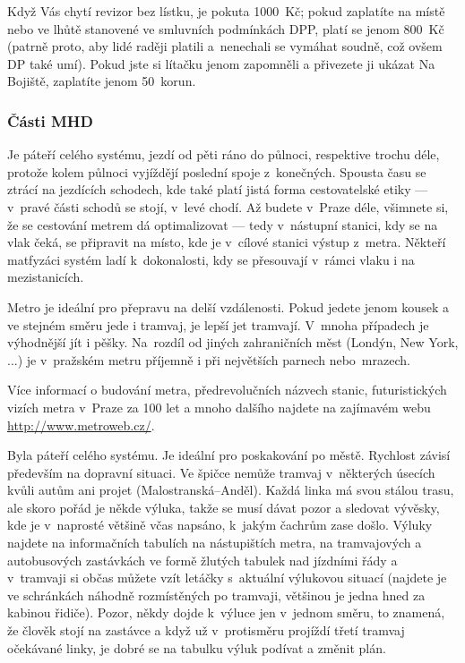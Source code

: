 
Když Vás chytí revizor bez lístku, je pokuta 1000~Kč; pokud
zaplatíte na místě nebo ve lhůtě stanovené ve smluvních podmínkách
DPP, platí se jenom 800~Kč (patrně proto, aby lidé raději platili
a~nenechali se vymáhat soudně, což ovšem DP také umí). Pokud jste
si lítačku jenom zapomněli a přivezete ji ukázat Na Bojiště,
zaplatíte jenom 50~korun.

\subsubsection{Části MHD}

Je páteří celého systému, jezdí od pěti ráno do půlnoci,
respektive trochu déle, protože kolem půlnoci vyjíždějí poslední
spoje z~konečných. Spousta času se ztrácí na jezdících schodech,
kde také platí jistá forma cestovatelské etiky --- v~pravé části
schodů se stojí, v~levé chodí. Až budete v~Praze déle, všimnete
si, že se cestování metrem dá optimalizovat --- tedy v~nástupní
stanici, kdy se na vlak čeká, se připravit na místo, kde je
v~cílové stanici výstup z~metra. Někteří matfyzáci systém ladí
k~dokonalosti, kdy se přesouvají v~rámci vlaku i na mezistanicích.


Metro je ideální pro přepravu na delší vzdálenosti. Pokud jedete
jenom kousek a ve stejném směru jede i tramvaj, je lepší jet
tramvají. V~mnoha případech je výhodnější jít i pěšky. Na~rozdíl
od jiných zahraničních měst (Londýn, New York, ...) je v~pražském
metru příjemně i při největších parnech nebo~mrazech.

Více informací o budování metra, předrevolučních názvech stanic,
futuristických vizích metra v~Praze za 100 let a mnoho dalšího
najdete na zajímavém webu \url{http://www.metroweb.cz/}.


Byla páteří celého systému. Je ideální pro poskakování po městě.
Rychlost závisí především na dopravní situaci. Ve špičce nemůže
tramvaj v~některých úsecích kvůli autům ani projet
(Malostranská--Anděl). Každá linka má svou stálou trasu, ale skoro
pořád je někde výluka, takže se musí dávat pozor a sledovat
vývěsky, kde je v~naprosté většině včas napsáno, k~jakým čachrům
zase došlo. Výluky najdete na informačních tabulích na
nástupištích metra, na tramvajových a autobusových zastávkách ve
formě žlutých tabulek nad jízdními řády a v~tramvaji si občas
můžete vzít letáčky s~aktuální výlukovou situací (najdete je ve
schránkách náhodně rozmístěných po tramvaji, většinou je jedna
hned za kabinou řidiče). Pozor, někdy dojde k~výluce jen v~jednom
směru, to znamená, že člověk stojí na zastávce a když už
v~protisměru projíždí třetí tramvaj očekávané linky, je dobré se na
tabulku výluk podívat a změnit plán.

